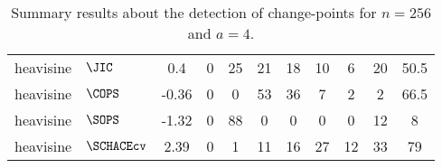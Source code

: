 \begin{table}[ht]
\begin{tabular}{llccccccccc}
  heavisine & $\JIC$ &   0.4 &     0 &    25 &    21 &    18 &    10 &     6 &    20 &  50.5 \\ 
  heavisine & $\COPS$ & -0.36 &     0 &     0 &    53 &    36 &     7 &     2 &     2 &  66.5 \\ 
  heavisine & $\SOPS$ & -1.32 &     0 &    88 &     0 &     0 &     0 &     0 &    12 &     8 \\ 
  heavisine & $\SCHACEcv$ &  2.39 &     0 &     1 &    11 &    16 &    27 &    12 &    33 &    79 \\ 
  \end{tabular}
\caption{Summary results about the detection of change-points for $n = 256$ and $a = 4$.} 
\label{tab:CPn256a4}
\end{table}
